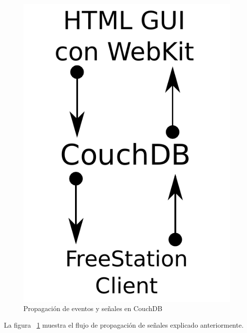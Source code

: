 \newpage

\begin{figure}[ht]
    \begin{center}
        \includegraphics[scale=0.5]{src/img/diagrams/event-propagation.pdf}
        \caption[Propagación de eventos y señales en CouchDB]
          {Propagación de eventos y señales en CouchDB}
          \label{fig:couchdbevent}
    \end{center}
\end{figure}

La figura ~\ref{fig:couchdbevent} muestra el flujo de propagación de señales
explicado anteriormente. 

